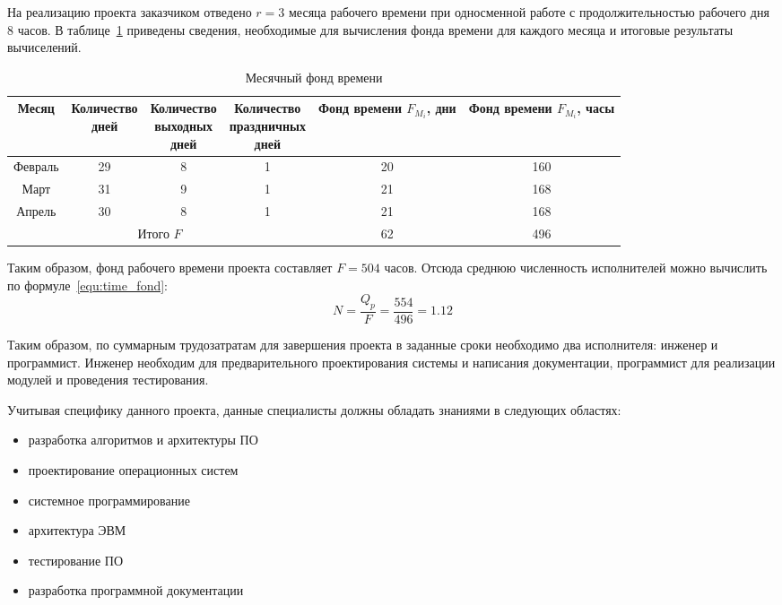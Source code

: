 На реализацию проекта заказчиком отведено $r = 3$ месяца рабочего времени при
односменной работе с продолжительностью рабочего дня 8 часов. В таблице~\ref{tab:month_time_fond}
приведены сведения, необходимые для вычисления фонда времени для каждого
месяца и итоговые результаты вычиселений.

\begin{table}
  \centering
  \caption{Месячный фонд времени}
  \label{tab:month_time_fond}
  \begin{tabular}{|c|c|c|c|c|c|}
    \hline
	Месяц & \thead{Количество \\ дней} & \thead{Количество \\ выходных \\ дней} &
		\thead{Количество \\ праздничных \\ дней} & \thead{Фонд \\ времени \\ $F_{M_{i}}$, дни} &
		\thead{Фонд \\ времени \\ $F_{M_{i}}$, часы} \\
    \hline
	Февраль & 29 & 8 & 1 & 20 & 160 \\
    \hline
	Март & 31 & 9 & 1 & 21 & 168 \\
    \hline
	Апрель & 30 & 8 & 1 & 21 & 168 \\
    \hline
	\multicolumn{4}{|c|}{Итого $F$} & 62 & 496 \\
    \hline
  \end{tabular}
\end{table}

Таким образом, фонд рабочего времени проекта составляет $F = 504$ часов.
Отсюда среднюю численность исполнителей можно вычислить по формуле~\ref{equ:time_fond}:
\begin{equation}
	N = \frac{Q_{p}}{F} = \frac{554}{496} = 1.12
\label{equ:time_fond}
\end{equation}

Таким образом, по суммарным трудозатратам для завершения проекта в заданные
сроки необходимо два исполнителя: инженер и программист. Инженер необходим для
предварительного проектирования системы и написания документации, программист
для реализации модулей и проведения тестирования.

Учитывая специфику данного проекта, данные специалисты должны обладать
знаниями в следующих областях:
\begin{itemize}
\item разработка алгоритмов и архитектуры ПО
\item проектирование операционных систем
\item системное программирование
\item архитектура ЭВМ
\item тестирование ПО
\item разработка программной документации
\end{itemize}

